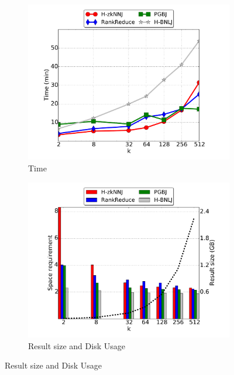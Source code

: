 \newpage
\begin{figure}[t]
\centering
		\begin{subfigure}[b]{0.3\textwidth}
                 \includegraphics[width=\textwidth]{img-perf/geo/k/time.pdf} 
                \caption{Time\label{fig:geo_k_time}} 
                
        \end{subfigure}%
        \begin{subfigure}[b]{0.3\textwidth}
                 \includegraphics[width=\textwidth]{img-perf/geo/k/memory.pdf} 
                \caption{Result size and Disk Usage\label{fig:geo_k_memory} }
                

\end{subfigure}
\end{figure}
